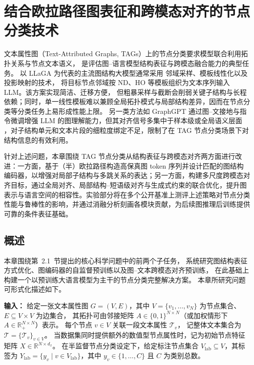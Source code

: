 
\chapter{结合欧拉路径图表征和跨模态对齐的节点分类技术}

文本属性图（Text-Attributed Graphs, TAGs）上的节点分类要求模型联合利用拓扑关系与节点文本语义，
是评估图--语言模型结构表征与跨模态融合能力的典型任务。
以 LLaGA\cite{Chen2024LLaGALL} 为代表的主流图结构大模型通常采用
邻域采样、模板线性化以及投影映射的技术，
将目标节点邻域按 ND、HO 等模板组织为文本序列输入 LLM。该方案实现简洁、迁移方便，
但粗暴采样与截断会削弱关键子结构与长程依赖；同时，单一线性模板难以兼顾全局拓扑模式与局部结构差异，因而在节点分类等分类任务上易形成性能上限。
另一类方法如 GraphGPT\cite{Tang2023GraphGPTGI} 
通过图--文接地与指令微调增强 LLM 的图理解能力，但其对齐信号多集中于样本级或全局语义层面
，对子结构单元和文本片段的细粒度绑定不足，限制了在 TAG 节点分类场景下对结构信息的有效利用。

针对上述问题，本章围绕 TAG 节点分类从结构表征与跨模态对齐两方面进行改进：一方面，基于（半）欧拉路径构造高保真图 token 序列并设计匹配的图结构编码器，以增强对局部子结构与多跳关系的表达；另一方面，构建多尺度跨模态对齐目标，通过全局对齐、局部结构--短语级对齐与生成式约束的联合优化，提升图表示与语言空间的相容性。实验部分将在多个公开基准上测评上述策略对节点分类性能与鲁棒性的影响，并通过消融分析刻画各模块贡献，为后续图推理后训练提供可靠的条件表征基础。

\section{概述}

本章围绕第~2.1~节提出的核心科学问题中的前两个子任务，
系统研究图结构表征方式优化、图编码器的自监督预训练以及图--文本跨模态对齐预训练，
在此基础上构建一个以预训练大语言模型为主干的节点分类完整解决方案。
本章所研究问题可形式化描述如下。

\textbf{输入：}
给定一张文本属性图
\(G=(V,E)\)，其中 \(V=\{v_1,\dots,v_N\}\) 为节点集合、\(E\subseteq V\times V\) 为边集合，
其拓扑可由邻接矩阵 \(A\in\{0,1\}^{N\times N}\)（或加权情形下 \(A\in\mathbb{R}^{N\times N}_{+}\)）表示。
每个节点 \(v\in V\) 关联一段文本属性 \(\mathcal{T}_v\)，
记整体文本集合为 \(\mathcal{T}=\{\mathcal{T}_v\}_{v\in V}\)。
当数据集同时提供额外的数值型节点属性时，记为初始节点特征矩阵
\(X\in\mathbb{R}^{N\times d_x}\)。
在半监督节点分类设定下，给定标注节点集合 \(V_{\mathrm{lab}}\subseteq V\)，其标签为
\(Y_{\mathrm{lab}}=\{y_v\mid v\in V_{\mathrm{lab}}\}\)，其中 \(y_v\in\{1,\dots,C\}\) 且 \(C\) 为类别总数。

